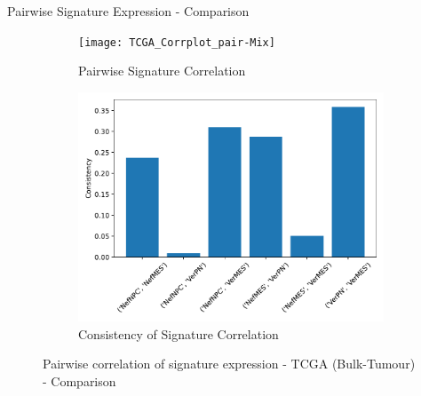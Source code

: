 \documentclass[aspectratio=169,9pt]{beamer}
\begin{document}
    \begin{frame}{Pairwise Signature Expression - Comparison}
        \begin{adjustwidth}{-5cm}{-5cm}
            \centering
            \begin{figure}\ContinuedFloat
                \centering
                \begin{subfigure}[c]{0.7\textwidth}
                    \centering
                    \texttt{[image: TCGA\_Corrplot\_pair-Mix]}
                    \caption{Pairwise Signature Correlation}
                \end{subfigure}
                \begin{subfigure}[c]{0.4\textwidth}
                    \centering
                    \includegraphics[width=\textwidth]{TCGA_Consistency_Mix}
                    \caption{Consistency of Signature Correlation}
                \end{subfigure}
                \caption{Pairwise correlation of signature expression - TCGA (Bulk-Tumour) - Comparison}
            \end{figure}
        \end{adjustwidth}
    \end{frame}
\end{document}
